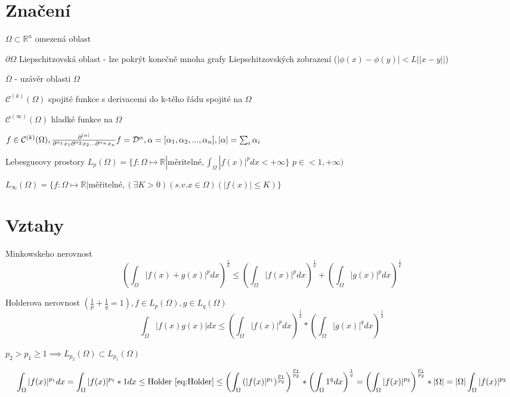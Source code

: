 \documentclass[../main.tex]{subfiles}
\begin{document}
\section{Značení}


$\Omega \subset \mathbb{R}^n$ omezená oblast

$\partial\Omega$ Liepschitzovská oblast - lze pokrýt konečně mnoha grafy Liepschitzovských zobrazení ($|\phi(x) -  \phi(y)| < L ||x-y||$)

$\bar{\Omega}$ - uzávěr oblasti $\Omega$

$\mathcal{C}^{(k)}(\Omega)$ spojité funkce s derivacemi do k-tého řádu spojité na $\Omega$

$\mathcal{C}^{(\infty)}(\Omega)$ hladké funkce na $\Omega$


$f\in\mathcal{C}^{(k)}(\Omega), \frac{\partial^{|\alpha|}}{\partial^{\alpha_1}x_1\partial^{\alpha_2}x_2...\partial^{\alpha_n}x_n} f = \mathcal{D}^\alpha, \alpha = [\alpha_1, \alpha_2, ..., \alpha_n], |\alpha|=\sum_i \alpha_i $




Lebesgueovy prostory
$L_p(\Omega) = \{f: \Omega \mapsto \mathbb{R}| \text{měritelné}, \int_{\Omega}|f(x)|^p dx < +\infty \}$
$p \in <1, +\infty)$

$L_\infty(\Omega) = \{  f:\Omega\mapsto\mathbb{R} | \text{měřitelné}, (\exists K > 0)(s.v. x \in\Omega)(|f(x)| \leq K)  \}$


\section{Vztahy}

Minkowskeho nerovnost
\begin{equation}\label{eq:Mink}
    \left ( \int_\Omega |f(x) + g(x)|^p dx \right ) ^{\frac{1}{p}} \leq \left ( \int_\Omega |f(x)|^p dx \right ) ^{\frac{1}{p}} + \left ( \int_\Omega |g(x)|^p dx \right ) ^{\frac{1}{p}}
\end{equation}


Holderova nerovnost
$\left (  \frac{1}{p} + \frac{1}{q} = 1 \right ), f \in L_p(\Omega), g \in L_q(\Omega)$
\begin{equation}\label{eq:Holder}
    \int_\Omega \left| f(x)g(x) \right| dx \leq \left ( \int_\Omega |f(x)|^p dx \right ) ^{\frac{1}{p}} * \left ( \int_\Omega |g(x)|^q dx \right ) ^{\frac{1}{q}}
\end{equation}

$p_2 > p_1 \geq 1 \implies L_{p_2}(\Omega) \subset L_{p_1}(\Omega)$


\begin{equation}
    \int_\Omega |f(x)|^{p_1}dx = \int_\Omega |f(x)|^{p_1} * 1dx \leq \text{Holder \eqref{eq:Holder}} \leq \left ( \int_\Omega \left ( |f(x)|^{p_1}\right )^{\frac{p_1}{p_2}} \right )^\frac{p_1}{p_2} * \left ( \int_\Omega 1 ^q dx \right ) ^ \frac{1}{q} = \left( \int_\Omega |f(x)|^{p_2} \right)^{\frac{p_1}{p_2}} * |\Omega| = |\Omega| \int_\Omega |f(x)|^{p_2}
\end{equation}
\end{document}
